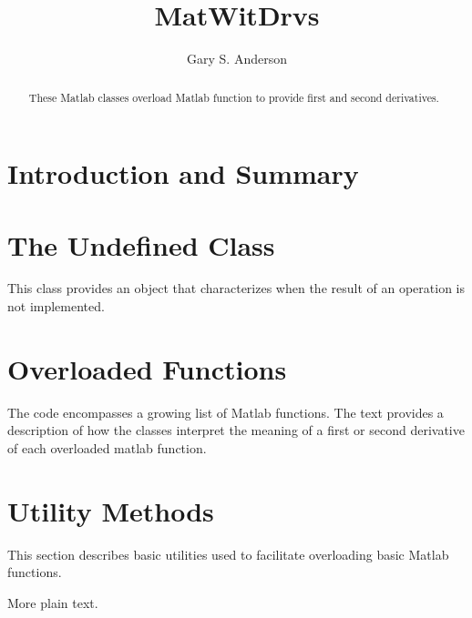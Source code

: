 \documentclass{article}
\title{MatWitDrvs}
\author{Gary S. Anderson}
\begin{document}
\maketitle
\begin{abstract}
These Matlab classes overload Matlab function to provide first and second
derivatives.
\end{abstract}

\section{Introduction and Summary}

\section{The Undefined Class}

This class provides an object that characterizes when the result of an operation
is not implemented.

\section{Overloaded Functions}

The code encompasses a growing list of Matlab functions.  The text provides a
description of how the classes interpret the meaning of a first or second
derivative of each overloaded matlab function.


\section{Utility Methods}

This section describes basic utilities used to facilitate overloading basic
Matlab functions.

More plain text.
\end{document}
